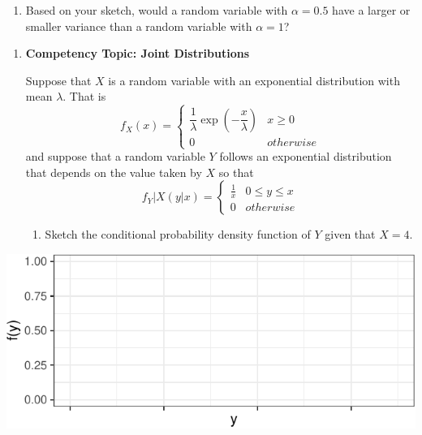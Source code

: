 \documentclass[11pt]{article}
\providecommand{\tightlist}{%
  \setlength{\itemsep}{0pt}\setlength{\parskip}{0pt}}
\begin{document}
\begin{enumerate}
\def\labelenumi{\alph{enumi}.}
\setcounter{enumi}{2}
\tightlist
\item
  Based on your sketch, would a random variable with \(\alpha = 0.5\)
  have a larger or smaller variance than a random variable with
  \(\alpha = 1\)?
\end{enumerate}

\newpage

\begin{enumerate}
\def\labelenumi{\arabic{enumi}.}
\setcounter{enumi}{2}
\item
  \textbf{Competency Topic: Joint Distributions}

  Suppose that \(X\) is a random variable with an exponential
  distribution with mean \(\lambda\). That is
  \[f_X(x) = \begin{cases} \dfrac{1}{\lambda} \exp\left(-\dfrac{x}{\lambda}\right) & x \ge 0 \\ 0 & otherwise \end{cases}\]
  and suppose that a random variable \(Y\) follows an exponential
  distribution that depends on the value taken by \(X\) so that
  \[f_Y|X(y|x) = \begin{cases} \frac{1}{x} & 0 \le y \le x \\ 0 & otherwise \end{cases}\]

  \begin{enumerate}
  \def\labelenumii{\alph{enumii}.}
  \tightlist
  \item
    Sketch the conditional probability density function of \(Y\) given
    that \(X = 4\).
  \end{enumerate}
\end{enumerate}

\begin{center}\includegraphics[width=.9\linewidth,height=.4\linewidth]{stat305-cq4_files/figure-latex/unnamed-chunk-3-1} \end{center}
\end{document}
